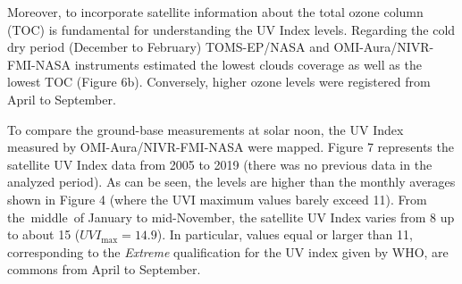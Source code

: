 \documentclass{article}
\begin{document}
Moreover, to incorporate satellite information about the total ozone
column (TOC) is fundamental for understanding the UV Index levels.
Regarding the cold dry period (December to February) TOMS-EP/NASA and
OMI-Aura/NIVR-FMI-NASA instruments estimated the lowest clouds coverage
as well as the lowest TOC (Figure 6b). %
Conversely, higher ozone levels were registered from April to
September.~

To compare the ground-base measurements at solar noon, the UV Index
measured by OMI-Aura/NIVR-FMI-NASA were mapped.
Figure 7 %
represents the satellite UV Index
data from 2005 to 2019 (there was no previous data in the analyzed
period). As can be seen, the levels are higher than the monthly averages
shown in Figure 4 %
(where the UVI maximum
values barely exceed 11). From the~middle~of January to mid-November,
the satellite UV Index varies from 8 up to about 15
(\(UVI_{\max}=14.9\)). In particular, values equal or larger than 11,
corresponding to the \emph{Extreme} qualification for the UV index given
by WHO, are commons from April to September.
\end{document}
